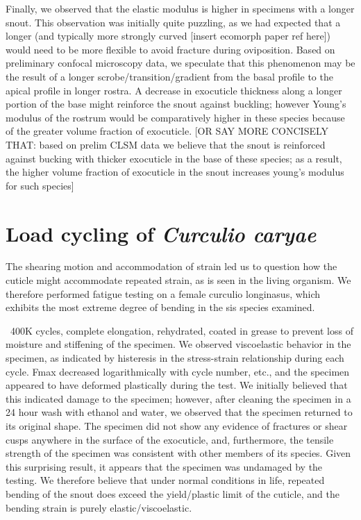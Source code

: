 \documentclass[twocolumn, linenumbers, superscriptaddress]{revtex4-1}
\begin{document}
		Finally, we observed that the elastic modulus is higher in specimens with a longer snout.
		This observation was initially quite puzzling, as we had expected that a longer (and typically more strongly curved [insert ecomorph paper ref here]) would need to be more flexible to avoid fracture during oviposition.
		Based on preliminary confocal microscopy data, we speculate that this phenomenon may be the result of a longer scrobe/transition/gradient from the basal profile to the apical profile in longer rostra.
		A decrease in exocuticle thickness along a longer portion of the base might reinforce the snout against buckling; however Young's modulus of the rostrum would be comparatively higher in these species because of the greater volume fraction of exocuticle.
		[OR SAY MORE CONCISELY THAT: based on prelim CLSM data we believe that the snout is reinforced against bucking with thicker exocuticle in the base of these species; as a result, the higher volume fraction of exocuticle in the snout increases young's modulus for such species]
	
	\section{Load cycling of \textit{Curculio caryae}}
		The shearing motion and accommodation of strain led us to question how the cuticle might accommodate repeated strain, as is seen in the living organism.
		We therefore performed fatigue testing on a female curculio longinasus, which exhibits the most extreme degree of bending in the sis species examined.
			
		~400K cycles, complete elongation, rehydrated, coated in grease to prevent loss of moisture and stiffening of the specimen.
		We observed viscoelastic behavior in the specimen, as indicated by histeresis in the stress-strain relationship during each cycle.
		Fmax decreased logarithmically with cycle number, etc., and the specimen appeared to have deformed plastically during the test.
		We initially believed that this indicated damage to the specimen; however, after cleaning the specimen in a 24 hour wash with ethanol and water, we observed that the specimen returned to its original shape.
		The specimen did not show any evidence of fractures or shear cusps anywhere in the surface of the exocuticle, and, furthermore, the tensile strength of the specimen was consistent with other members of its species.
		Given this surprising result, it appears that the specimen was undamaged by the testing.
		We therefore believe that under normal conditions in life, repeated bending of the snout does exceed the yield/plastic limit of the cuticle, and the bending strain is purely elastic/viscoelastic.
		
\end{document}
